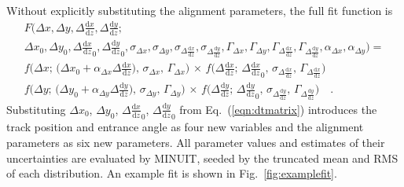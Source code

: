 \documentclass[11pt,twoside,a4paper,cmspaper]{cms-tdr}
\begin{document}
Without explicitly substituting the alignment parameters, the full fit
function is
\begin{multline}
F\bigg(\Delta x, \Delta y, \Delta \tfrac{\textrm{d}x}{\textrm{d}z}, \Delta \tfrac{\textrm{d}y}{\textrm{d}z}; \\
{\Delta x}_0, {\Delta y}_0, {\Delta \frac{\textrm{d}x}{\textrm{d}z}}_0, {\Delta \frac{\textrm{d}y}{\textrm{d}z}}_0,
\sigma_{\Delta x}, \sigma_{\Delta y}, \sigma_{\Delta \tfrac{\textrm{d}x}{\textrm{d}z}}, \sigma_{\Delta \tfrac{\textrm{d}y}{\textrm{d}z}},
\Gamma_{\Delta x}, \Gamma_{\Delta y}, \Gamma_{\Delta \tfrac{\textrm{d}x}{\textrm{d}z}}, \Gamma_{\Delta \tfrac{\textrm{d}y}{\textrm{d}z}},
\alpha_{\Delta x}, \alpha_{\Delta y}) = \\
f\bigg(\Delta x; \, \big({\Delta x}_0 + \alpha_{\Delta x} \Delta \tfrac{\textrm{d}x}{\textrm{d}z}\big), \, \sigma_{\Delta x}, \, \Gamma_{\Delta x}\bigg) \, \times \,
f\bigg(\Delta \tfrac{\textrm{d}x}{\textrm{d}z}; \, {\Delta \tfrac{\textrm{d}x}{\textrm{d}z}}_0, \, \sigma_{\Delta \tfrac{\textrm{d}x}{\textrm{d}z}}, \, \Gamma_{\Delta \tfrac{\textrm{d}x}{\textrm{d}z}}\bigg) \\
f\bigg(\Delta y; \, \big({\Delta y}_0 + \alpha_{\Delta y} \Delta \tfrac{\textrm{d}y}{\textrm{d}z}\big), \, \sigma_{\Delta y}, \, \Gamma_{\Delta y}\bigg) \, \times \,
f\bigg(\Delta \tfrac{\textrm{d}y}{\textrm{d}z}; \, {\Delta \tfrac{\textrm{d}y}{\textrm{d}z}}_0, \, \sigma_{\Delta \tfrac{\textrm{d}y}{\textrm{d}z}}, \, \Gamma_{\Delta \tfrac{\textrm{d}y}{\textrm{d}z}}\bigg)\quad\mbox{.}
\label{eqn:fitfunc}
\end{multline}
Substituting $\Delta x_0$, $\Delta y_0$, $\Delta {\frac{\textrm{d}x}{\textrm{d}z}}_0$, $\Delta {\frac{\textrm{d}y}{\textrm{d}z}}_0$
from Eq.~(\ref{eqn:dtmatrix}) introduces the track position and
entrance angle as four new variables and the alignment parameters as
six new parameters.  All parameter values and estimates of their
uncertainties are evaluated by MINUIT, seeded by the truncated mean
and RMS of each distribution.  An example fit is shown in Fig.~\ref{fig:examplefit}.
\end{document}
